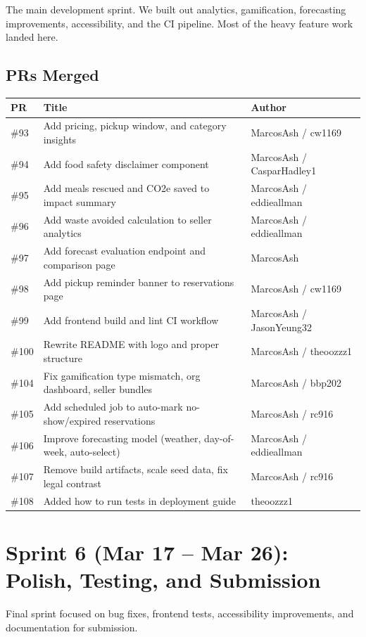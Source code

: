 \documentclass[a4paper,11pt]{article}
\begin{document}
The main development sprint. We built out analytics, gamification, forecasting improvements, accessibility, and the CI pipeline. Most of the heavy feature work landed here.

\subsection*{PRs Merged}

\begin{tabular}{l l l}
\toprule
PR & Title & Author \\
\midrule
\#93 & Add pricing, pickup window, and category insights & MarcosAsh / cw1169 \\
\#94 & Add food safety disclaimer component & MarcosAsh / CasparHadley1 \\
\#95 & Add meals rescued and CO2e saved to impact summary & MarcosAsh / eddieallman \\
\#96 & Add waste avoided calculation to seller analytics & MarcosAsh / eddieallman \\
\#97 & Add forecast evaluation endpoint and comparison page & MarcosAsh \\
\#98 & Add pickup reminder banner to reservations page & MarcosAsh / cw1169 \\
\#99 & Add frontend build and lint CI workflow & MarcosAsh / JasonYeung32 \\
\#100 & Rewrite README with logo and proper structure & MarcosAsh / theoozzz1 \\
\#104 & Fix gamification type mismatch, org dashboard, seller bundles & MarcosAsh / bbp202 \\
\#105 & Add scheduled job to auto-mark no-show/expired reservations & MarcosAsh / rc916 \\
\#106 & Improve forecasting model (weather, day-of-week, auto-select) & MarcosAsh / eddieallman \\
\#107 & Remove build artifacts, scale seed data, fix legal contrast & MarcosAsh / rc916 \\
\#108 & Added how to run tests in deployment guide & theoozzz1 \\
\bottomrule
\end{tabular}

\section*{Sprint 6 (Mar 17 -- Mar 26): Polish, Testing, and Submission}

Final sprint focused on bug fixes, frontend tests, accessibility improvements, and documentation for submission.
\end{document}
